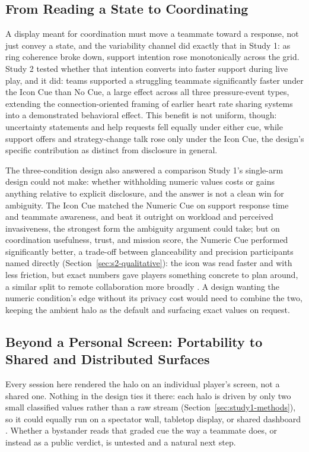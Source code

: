 \documentclass[manuscript,review,anonymous]{acmart}
\begin{document}
\subsection{From Reading a State to Coordinating}
A display meant for coordination must move a teammate toward a response, not just convey a state, and the variability channel did exactly that in Study 1: as ring coherence broke down, support intention rose monotonically across the grid. Study 2 tested whether that intention converts into faster support during live play, and it did: teams supported a struggling teammate significantly faster under the Icon Cue than No Cue, a large effect across all three pressure-event types, extending the connection-oriented framing of earlier heart rate sharing systems \cite{hassib_heartchat_2017, janssen_intimate_2010, jarvela_augmented_2021} into a demonstrated behavioral effect. This benefit is not uniform, though: uncertainty statements and help requests fell equally under either cue, while support offers and strategy-change talk rose only under the Icon Cue, the design's specific contribution as distinct from disclosure in general.

The three-condition design also answered a comparison Study 1's single-arm design could not make: whether withholding numeric values costs or gains anything relative to explicit disclosure, and the answer is not a clean win for ambiguity. The Icon Cue matched the Numeric Cue on support response time and teammate awareness, and beat it outright on workload and perceived invasiveness, the strongest form the ambiguity argument could take; but on coordination usefulness, trust, and mission score, the Numeric Cue performed significantly better, a trade-off between glanceability and precision participants named directly (Section~\ref{sec:s2-qualitative}): the icon was read faster and with less friction, but exact numbers gave players something concrete to plan around, a similar split to remote collaboration more broadly \cite{fink_avatars_2024}. A design wanting the numeric condition's edge without its privacy cost would need to combine the two, keeping the ambient halo as the default and surfacing exact values on request.

\subsection{Beyond a Personal Screen: Portability to Shared and Distributed Surfaces}
Every session here rendered the halo on an individual player's screen, not a shared one. Nothing in the design ties it there: each halo is driven by only two small classified values rather than a raw stream (Section~\ref{sec:study1-methods}), so it could equally run on a spectator wall, tabletop display, or shared dashboard \cite{morrisonsmith_ambiteam_2021, liu_animo_2019}. Whether a bystander reads that graded cue the way a teammate does, or instead as a public verdict, is untested and a natural next step.
\end{document}
